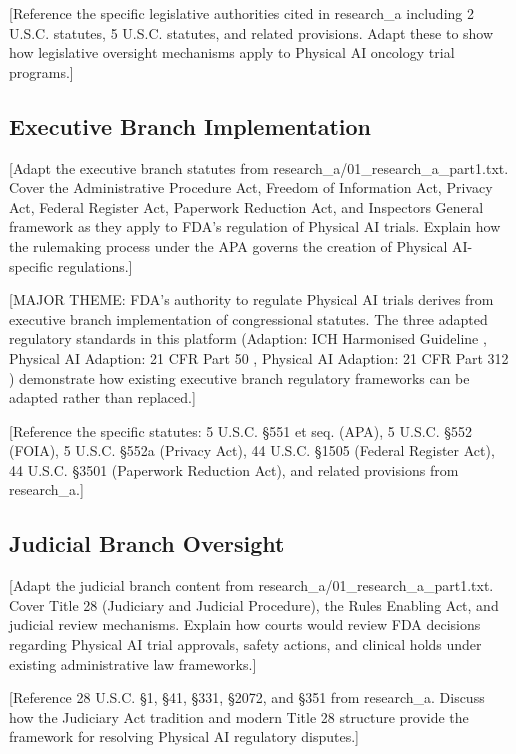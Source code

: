[Reference the specific legislative authorities cited in research\_a including
2 U.S.C. statutes, 5 U.S.C. statutes, and related provisions. Adapt these to
show how legislative oversight mechanisms apply to Physical AI oncology trial
programs.]

\subsection{Executive Branch Implementation}
\label{subsec:executive}

[Adapt the executive branch statutes from research\_a/01\_research\_a\_part1.txt.
Cover the Administrative Procedure Act, Freedom of Information Act, Privacy Act,
Federal Register Act, Paperwork Reduction Act, and Inspectors General framework
as they apply to FDA's regulation of Physical AI trials. Explain how the
rulemaking process under the APA governs the creation of Physical AI-specific
regulations.]

[MAJOR THEME: FDA's authority to regulate Physical AI trials derives from
executive branch implementation of congressional statutes. The three adapted
regulatory standards in this platform (Adaption: ICH Harmonised Guideline
\cite{ich-adapt}, Physical AI Adaption: 21 CFR Part 50 \cite{cfr50-adapt},
Physical AI Adaption: 21 CFR Part 312 \cite{cfr312-adapt}) demonstrate how
existing executive branch regulatory frameworks can be adapted rather than
replaced.]

[Reference the specific statutes: 5 U.S.C. \S 551 et seq. (APA), 5 U.S.C.
\S 552 (FOIA), 5 U.S.C. \S 552a (Privacy Act), 44 U.S.C. \S 1505 (Federal
Register Act), 44 U.S.C. \S 3501 (Paperwork Reduction Act), and related
provisions from research\_a.]

\subsection{Judicial Branch Oversight}
\label{subsec:judicial}

[Adapt the judicial branch content from research\_a/01\_research\_a\_part1.txt.
Cover Title 28 (Judiciary and Judicial Procedure), the Rules Enabling Act, and
judicial review mechanisms. Explain how courts would review FDA decisions
regarding Physical AI trial approvals, safety actions, and clinical holds under
existing administrative law frameworks.]

[Reference 28 U.S.C. \S 1, \S 41, \S 331, \S 2072, and \S 351 from
research\_a. Discuss how the Judiciary Act tradition and modern Title 28
structure provide the framework for resolving Physical AI regulatory disputes.]

